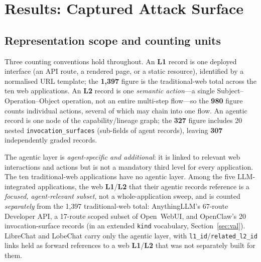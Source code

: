 \documentclass[11pt,a4paper]{article}
\newcommand{\cd}[1]{\lstinline[basicstyle=\ttfamily\small]|#1|}
\renewcommand{\L}[1]{\textbf{L#1}}
\begin{document}
\section{Results: Captured Attack Surface}

\subsection{Representation scope and counting units}\label{sec:scope-note}
Three counting conventions hold throughout. An \L1 record is one deployed interface
(an API route, a rendered page, or a static resource), identified by a normalised URL
template; the \textbf{1{,}397} figure is the traditional-web total across the ten web
applications. An \L2 record is one \emph{semantic action}---a single
Subject--Operation--Object operation, not an entire multi-step flow---so the \textbf{980}
figure counts individual actions, several of which may chain into one flow. An agentic
record is one node of the capability/lineage graph; the \textbf{327} figure includes 20
nested \cd{invocation_surfaces} (sub-fields of agent records), leaving \textbf{307}
independently graded records.

The agentic layer is \emph{agent-specific and additional}: it is linked to relevant web
interactions and actions but is not a mandatory third level for every application. The ten
traditional-web applications have no agentic layer. Among the five LLM-integrated
applications, the web \L1/\L2 that their agentic records reference is a \emph{focused,
agent-relevant subset}, not a whole-application sweep, and is counted \emph{separately} from
the 1{,}397 traditional-web total: AnythingLLM's 67-route Developer API, a 17-route scoped
subset of Open~WebUI, and OpenClaw's 20 invocation-surface records (in an extended
\cd{kind} vocabulary, Section~\ref{sec:val}). LibreChat and LobeChat carry only the agentic
layer, with \cd{l1_id}/\cd{related_l2_id} links held as forward references to a web \L1/\L2
that was not separately built for them.
\end{document}
